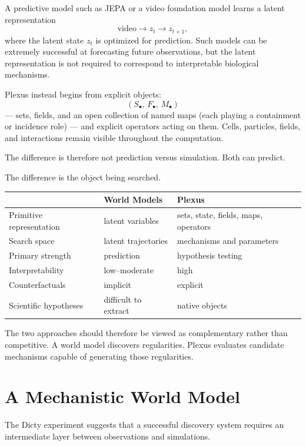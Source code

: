 \documentclass[11pt]{article}
\begin{document}
A predictive model such as JEPA or a video foundation model learns a latent
representation
\[
\text{video}
\longrightarrow
z_t
\longrightarrow
z_{t+1},
\]
where the latent state $z_t$ is optimized for prediction. Such models can be
extremely successful at forecasting future observations, but the latent
representation is not required to correspond to interpretable biological
mechanisms.

Plexus instead begins from explicit objects:
\[
(S_\bullet,\, F_\bullet,\, M_\bullet)
\]
--- sets, fields, and an open collection of named maps (each playing a containment
or incidence role) --- and explicit operators acting on them. Cells, particles, fields, and
interactions remain visible throughout the computation.

The difference is therefore not prediction versus simulation. Both can predict.

The difference is the object being searched.

\begin{center}
\renewcommand{\arraystretch}{1.3}
\footnotesize
\begin{tabular}{@{}p{3.6cm}p{4cm}p{4cm}@{}}
\toprule
& \textbf{World Models} & \textbf{Plexus} \\
\midrule
Primitive representation & latent variables & sets, state, fields, maps, operators \\
Search space & latent trajectories & mechanisms and parameters \\
Primary strength & prediction & hypothesis testing \\
Interpretability & low--moderate & high \\
Counterfactuals & implicit & explicit \\
Scientific hypotheses & difficult to extract & native objects \\
\bottomrule
\end{tabular}
\end{center}

The two approaches should therefore be viewed as complementary rather than
competitive. A world model discovers regularities. Plexus evaluates candidate
mechanisms capable of generating those regularities.

\section{A Mechanistic World Model}
\label{sec:mechanistic-wm}

The Dicty experiment suggests that a successful discovery system requires an
intermediate layer between observations and simulations.
\end{document}
